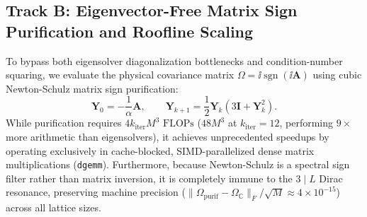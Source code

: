 \subsection{Track B: Eigenvector-Free Matrix Sign Purification and Roofline Scaling}
To bypass both eigensolver diagonalization bottlenecks and condition-number squaring, we evaluate the physical covariance matrix $\Omega = \ii \operatorname{sgn}(\ii \mathbf{A})$ using cubic Newton-Schulz matrix sign purification:
\begin{equation}
\label{eq:newton_schulz_formula}
\mathbf{Y}_0 = -\frac{1}{\alpha} \mathbf{A}, \qquad \mathbf{Y}_{k+1} = \frac{1}{2} \mathbf{Y}_k \left( 3\mathbf{I} + \mathbf{Y}_k^2 \right).
\end{equation}
While purification requires $4 k_{\mathrm{iter}} M^3 \text{ FLOPs}$ ($48 M^3$ at $k_{\mathrm{iter}} = 12$, performing $9\times$ more arithmetic than eigensolvers), it achieves unprecedented speedups by operating exclusively in cache-blocked, SIMD-parallelized dense matrix multiplications (\texttt{dgemm}).
Furthermore, because Newton-Schulz is a spectral sign filter rather than matrix inversion, it is completely immune to the $3 \mid L$ Dirac resonance, preserving machine precision ($\|\Omega_{\mathrm{purif}} - \Omega_{\mathbb{C}}\|_F / \sqrt{M} \approx 4 \times 10^{-15}$) across all lattice sizes.

